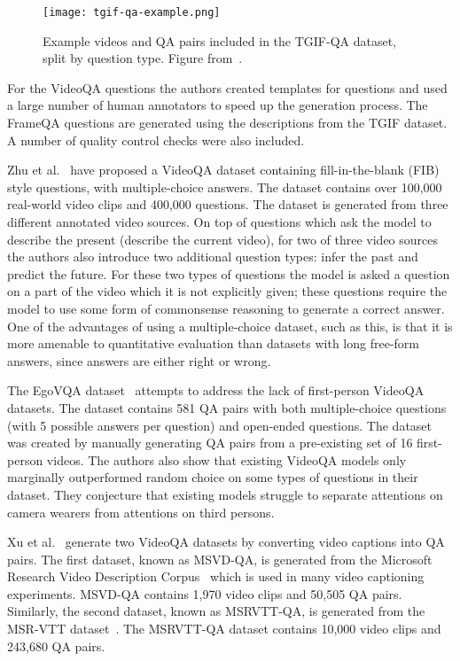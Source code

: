 \documentclass[../interim.tex]{subfiles}
\begin{document}
\begin{figure}
  \centering
  \texttt{[image: tgif-qa-example.png]}
  \caption{Example videos and QA pairs included in the TGIF-QA dataset, split by question type. Figure from~\cite{dataset:tgif-qa}.}
  \label{fig:tgif-examples}
\end{figure}

For the VideoQA questions the authors created templates for questions and used a large number of human annotators to speed up the generation process. The FrameQA questions are generated using the descriptions from the TGIF dataset. A number of quality control checks were also included.

Zhu et al.~\cite{dataset:zhu} have proposed a VideoQA dataset containing fill-in-the-blank (FIB) style questions, with multiple-choice answers. The dataset contains over 100,000 real-world video clips and 400,000 questions. The dataset is generated from three different annotated video sources. On top of questions which ask the model to describe the present (describe the current video), for two of three video sources the authors also introduce two additional question types: infer the past and predict the future. For these two types of questions the model is asked a question on a part of the video which it is not explicitly given; these questions require the model to use some form of commonsense reasoning to generate a correct answer. One of the advantages of using a multiple-choice dataset, such as this, is that it is more amenable to quantitative evaluation than datasets with long free-form answers, since answers are either right or wrong.

The EgoVQA dataset~\cite{dataset:ego-vqa} attempts to address the lack of first-person VideoQA datasets. The dataset contains 581 QA pairs with both multiple-choice questions (with 5 possible answers per question) and open-ended questions. The dataset was created by manually generating QA pairs from a pre-existing set of 16 first-person videos. The authors also show that existing VideoQA models only marginally outperformed random choice on some types of questions in their dataset. They conjecture that existing models struggle to separate attentions on camera wearers from attentions on third persons.

Xu et al.~\cite{dataset:xu} generate two VideoQA datasets by converting video captions into QA pairs. The first dataset, known as MSVD-QA, is generated from the Microsoft Research Video Description Corpus~\cite{dataset:msvd} which is used in many video captioning experiments. MSVD-QA contains 1,970 video clips and 50,505 QA pairs. Similarly, the second dataset, known as MSRVTT-QA, is generated from the MSR-VTT dataset~\cite{dataset:msr-vtt}. The MSRVTT-QA dataset contains 10,000 video clips and 243,680 QA pairs.
\end{document}
